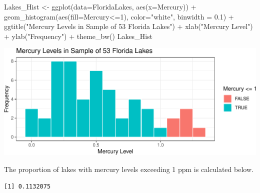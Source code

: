 \documentclass[
  letterpaper,
  DIV=11,
  numbers=noendperiod]{scrreprt}
\newenvironment{Shaded}{\begin{snugshade}}{\end{snugshade}}
\newcommand{\AttributeTok}[1]{\textcolor[rgb]{0.40,0.45,0.13}{#1}}
\newcommand{\DecValTok}[1]{\textcolor[rgb]{0.68,0.00,0.00}{#1}}
\newcommand{\FloatTok}[1]{\textcolor[rgb]{0.68,0.00,0.00}{#1}}
\newcommand{\FunctionTok}[1]{\textcolor[rgb]{0.28,0.35,0.67}{#1}}
\newcommand{\NormalTok}[1]{\textcolor[rgb]{0.00,0.23,0.31}{#1}}
\newcommand{\OtherTok}[1]{\textcolor[rgb]{0.00,0.23,0.31}{#1}}
\newcommand{\SpecialCharTok}[1]{\textcolor[rgb]{0.37,0.37,0.37}{#1}}
\newcommand{\StringTok}[1]{\textcolor[rgb]{0.13,0.47,0.30}{#1}}
\begin{document}
\begin{Shaded}
\begin{Highlighting}[]
\NormalTok{Lakes\_Hist }\OtherTok{\textless{}{-}} \FunctionTok{ggplot}\NormalTok{(}\AttributeTok{data=}\NormalTok{FloridaLakes, }\FunctionTok{aes}\NormalTok{(}\AttributeTok{x=}\NormalTok{Mercury)) }\SpecialCharTok{+} 
  \FunctionTok{geom\_histogram}\NormalTok{(}\FunctionTok{aes}\NormalTok{(}\AttributeTok{fill=}\NormalTok{Mercury}\SpecialCharTok{\textless{}=}\DecValTok{1}\NormalTok{), }\AttributeTok{color=}\StringTok{"white"}\NormalTok{, }\AttributeTok{binwidth =} \FloatTok{0.1}\NormalTok{) }\SpecialCharTok{+} 
  \FunctionTok{ggtitle}\NormalTok{(}\StringTok{"Mercury Levels in Sample of 53 Florida Lakes"}\NormalTok{) }\SpecialCharTok{+} 
  \FunctionTok{xlab}\NormalTok{(}\StringTok{"Mercury Level"}\NormalTok{) }\SpecialCharTok{+} \FunctionTok{ylab}\NormalTok{(}\StringTok{"Frequency"}\NormalTok{) }\SpecialCharTok{+} \FunctionTok{theme\_bw}\NormalTok{()}
\NormalTok{Lakes\_Hist}
\end{Highlighting}
\end{Shaded}

\includegraphics{Ch3_files/figure-pdf/unnamed-chunk-46-1.pdf}

The proportion of lakes with mercury levels exceeding 1 ppm is
calculated below.

\begin{Shaded}
\end{Shaded}

\begin{verbatim}
[1] 0.1132075
\end{verbatim}
\end{document}
